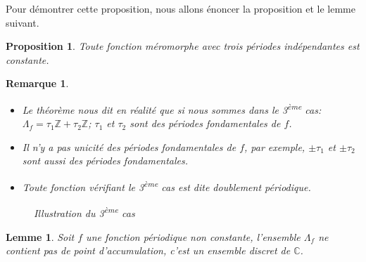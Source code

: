 \documentclass[12pt]{article}
\newtheorem{lemma}{Lemme}
\newtheorem{remark}{Remarque}
\newtheorem{proposition}{Proposition}
\begin{document}
\vspace{0.5cm}
Pour démontrer cette proposition, nous allons énoncer la proposition et le lemme suivant.

\begin{proposition} \quad Toute fonction méromorphe avec trois périodes indépendantes est constante. \end{proposition}

\begin{remark}
\begin{itemize}
    \item[(i)] Le théorème nous dit en réalité que si nous sommes dans le 3\textsuperscript{ème} cas: \( \Lambda_f = \tau_1 \mathbb{Z} + \tau_2 \mathbb{Z} \); \( \tau_1 \) et \( \tau_2 \) sont des périodes fondamentales de \( f \).
    \item[(ii)] Il n'y a pas unicité des périodes fondamentales de \( f \), par exemple, \( \pm \tau_1 \) et \( \pm \tau_2 \) sont aussi des périodes fondamentales.
    \item[(iii)] Toute fonction vérifiant le 3\textsuperscript{ème} cas est dite doublement périodique.
\end{itemize}

\begin{figure}[h]
    \centering
    \caption{Illustration du 3\textsuperscript{ème} cas}
\end{figure}
\end{remark}
\begin{lemma}
Soit \( f \) une fonction périodique non constante, l'ensemble \( \Lambda_f \) ne contient pas de point d'accumulation, c'est un ensemble discret de \( \mathbb{C} \).
\end{lemma}
\end{document}
